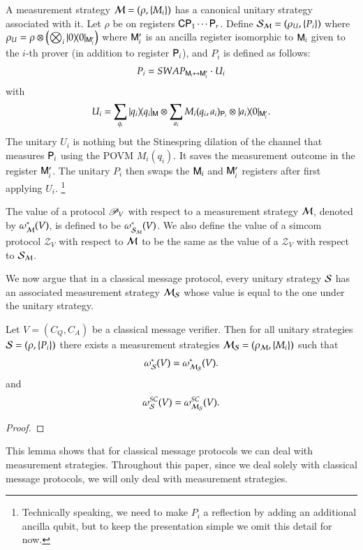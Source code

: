 A measurement strategy $\mathcal M = (\rho,\{M_i\})$ has a canonical unitary strategy associated with it.
Let $\rho$ be on registers ${\mathsf{C}} {\mathsf{P}}_1 \cdots {\mathsf{P}}_r$. Define $\mathcal{S}_\mathcal M = (\rho_U,\{P_i\})$ where $\rho_U = \rho \otimes \left( \bigotimes_i |0\rangle\! \langle 0|_{{\mathsf{M}}_i'}\right)$ where ${\mathsf{M}}_i'$ is an ancilla register isomorphic to ${\mathsf{M}}_i$ given to the $i$-th prover (in addition to register ${\mathsf{P}}_i$), and $P_i$ is defined as follows:
\[
	P_i = SWAP_{{\mathsf{M}}_i \leftrightarrow {\mathsf{M}}_i'} \cdot U_i
\]
with
\[
	U_i = \sum_{q_i} |q_i\rangle\! \langle q_i|_{{\mathsf{M}}} \otimes \sum_{a_i} M_i(q_i,a_i)_{{\mathsf{P}}_i} \otimes |a_i\rangle\! \langle 0|_{{\mathsf{M}}_i'}.
\]
The unitary $U_i$ is nothing but the Stinespring dilation of the channel that measures ${\mathsf{P}}_i$ using the POVM $M_i(q_i)$. It saves the measurement outcome in the register ${\mathsf{M}}_i'$. The unitary $P_i$ then swaps the ${\mathsf{M}}_i$ and ${\mathsf{M}}_i'$ registers after first applying $U_i$. \footnote{Technically speaking, we need to make $P_i$ a reflection by adding an additional ancilla qubit, but to keep the presentation simple we omit this detail for now.} 

The value of a protocol $\mathscr{P}_V$ with respect to a measurement strategy $\mathcal M$, denoted by $\omega^*_{\mathcal M}(V)$, is defined to be $\omega^*_{\mathcal{S}_\mathcal M}(V)$. We also define the value of a simcom protocol $\mathscr{Z}_V$ with respect to $\mathcal M$ to be the same as the value of a $\mathscr{Z}_V$ with respect to $\mathcal{S}_\mathcal M$. 

We now argue that in a classical message protocol, every unitary strategy $\mathcal{S}$ has an associated measurement strategy $\mathcal M_{\mathcal{S}}$ whose value is equal to the one under the unitary strategy.

\begin{lemma}
\label{lem:unitary_measurement_strat}
Let $V = (C_Q,C_A)$ be a classical message verifier. Then for all unitary strategies $\mathcal{S} = (\rho,\{ P_i \})$ there exists a measurement strategies $\mathcal M_{\mathcal{S}} = (\rho_\mathcal M,\{M_i\})$ such that
	\[
		\omega^*_{\mathcal{S}}(V) = \omega^*_{\mathcal M_{\mathcal{S}}}(V).
	\]
	and
	\[
		\omega^{SC}_{\mathcal{S}}(V) = \omega^{SC}_{\mathcal M_{\mathcal{S}}}(V).
	\]	
\end{lemma}
\begin{proof}
\end{proof}

This lemma shows that for classical message protocols we can deal with measurement strategies. Throughout this paper, since we deal solely with classical message protocols, we will only deal with measurement strategies.

